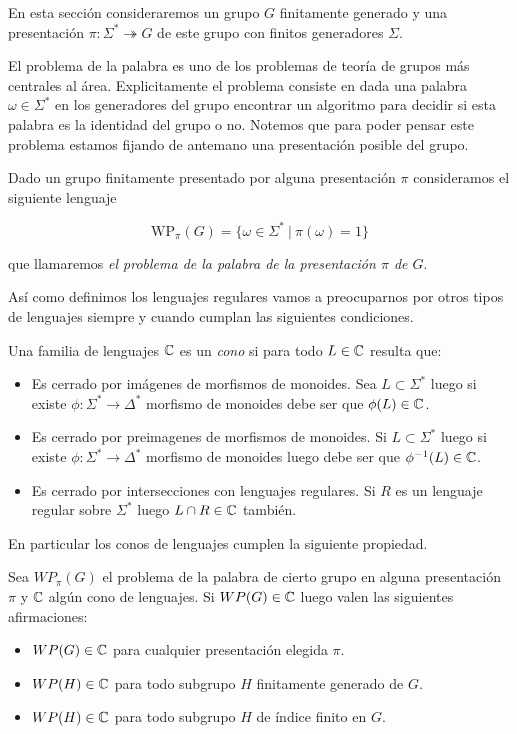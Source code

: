 \documentclass[tesis.tex]{subfiles}
\begin{document}
En esta sección consideraremos un grupo $G$ finitamente generado y una presentación $\pi: \Sigma^* \twoheadrightarrow  G$ de este grupo con finitos generadores $\Sigma$. 

El problema de la palabra es uno de los problemas de teoría de grupos más centrales al área. Explicitamente el problema consiste en dada una palabra $\omega \in \Sigma^*$ en los generadores del grupo encontrar un algoritmo para decidir si esta palabra es la identidad del grupo o no. Notemos que para poder pensar este problema estamos fijando de antemano una presentación posible del grupo.

Dado un grupo finitamente presentado por alguna presentación $\pi$ consideramos el siguiente lenguaje 

$$\text{WP}_\pi (G) = \{ \omega \in \Sigma^* \ | \ \pi(\omega)=1 \}$$

que llamaremos \emph{el problema de la palabra de la presentación $\pi$ de $G$}. 



Así como definimos los lenguajes regulares vamos a preocuparnos por otros tipos de lenguajes siempre y cuando cumplan las siguientes condiciones.

\begin{deff}
	Una familia de lenguajes $\mathbb C$ es un \emph{cono} si para todo $L \in \mathbb C$ resulta que:
	\begin{itemize}
		\item Es cerrado por imágenes de morfismos de monoides. Sea $L \subset \Sigma^*$ luego si existe $\phi:\Sigma^* \to \Delta^*$ morfismo de monoides debe ser que $\phi(L) \in \mathbb C$.
		\item Es cerrado por preimagenes de morfismos de monoides. Si $L \subset \Sigma^*$ luego si existe $\phi:\Sigma^* \to \Delta^*$ morfismo de monoides luego debe ser que $\phi^{-1}(L) \in \mathbb C$. 
		\item Es cerrado por intersecciones con lenguajes regulares. Si $R$ es un lenguaje regular sobre $\Sigma^*$ luego $L \cap R \in \mathbb C$ también.
	\end{itemize}
\end{deff} 

En particular los conos de lenguajes cumplen la siguiente propiedad.

\begin{prop}
	Sea $WP_\pi(G)$ el problema de la palabra de cierto grupo en alguna presentación $\pi$ y $\mathbb C$ algún cono de lenguajes. Si $WP(G) \in \mathbb C$ luego valen las siguientes afirmaciones:
	\begin{itemize}
		\item $WP(G) \in \mathbb C$ para cualquier presentación elegida $\pi$.
		\item $WP(H) \in \mathbb C$ para todo subgrupo $H$ finitamente generado de $G$.
		\item $WP(H) \in \mathbb C$ para todo subgrupo $H$ de índice finito en $G$.
	\end{itemize} 
\end{prop}
\end{document}
